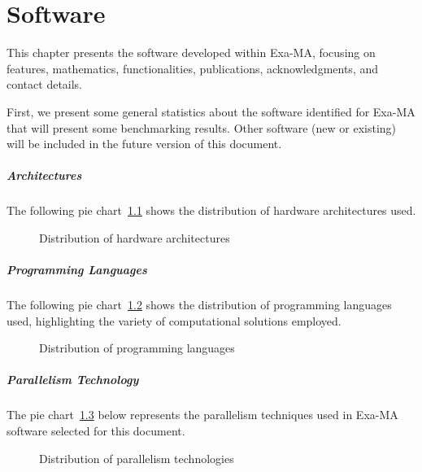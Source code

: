 \clearpage
\chapter{Software}
\label{sec:software}

    This chapter presents the software developed within Exa-MA, focusing on features, mathematics, functionalities, publications, acknowledgments, and contact details.

    First, we present some general statistics about the software identified for Exa-MA that will present some benchmarking results. 
    Other software (new or existing) will be included in the future version of this document.
    
        \paragraph{Architectures}
        The following pie chart~\ref{fig:arch} shows the distribution of hardware architectures used.
        \begin{figure}[H]
\centering
{}
\caption{Distribution of hardware architectures}
\label{fig:arch}
\end{figure}

        \paragraph{Programming Languages}
        The following pie chart~\ref{fig:languages} shows the distribution of programming languages used, highlighting the variety of computational solutions employed.
        \begin{figure}[H]
\centering
{}
\caption{Distribution of programming languages}
\label{fig:languages}
\end{figure}

        \paragraph{Parallelism Technology}
        The pie chart~\ref{fig:parallelism} below represents the parallelism techniques used in Exa-MA software selected for this document.
        \begin{figure}[H]
\centering
{}
\caption{Distribution of parallelism technologies}
\label{fig:parallelism}
\end{figure}

